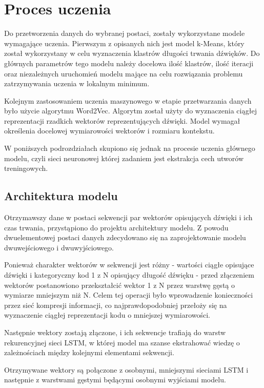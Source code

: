 \chapter{Proces uczenia} 
{
    Do przetworzenia danych do wybranej postaci, zostały wykorzystane modele wymagające uczenia.
    Pierwszym z opisanych nich jest model k-Means, który został wykorzystany w celu wyznaczenia klastrów
    długości trwania dźwięków. Do głównych parametrów tego modelu należy docelowa ilość klastrów, ilość iteracji
    oraz niezależnych uruchomień modelu mające na celu rozwiązania problemu zatrzymywania uczenia w lokalnym minimum.
    
    Kolejnym zastosowaniem uczenia maszynowego w etapie przetwarzania danych było użycie algorytmu Word2Vec. Algorytm 
    został użyty do wyznaczenia ciągłej reprezentacji rzadkich wektorów reprezentujących dźwięki. Model wymagał 
    określenia docelowej wymiarowości wektorów i rozmiaru kontekstu. 

    W poniższych podrozdziałach skupiono się jednak na procesie uczenia głównego modelu, czyli sieci neuronowej której
    zadaniem jest ekstrakcja cech utworów treningowych.

    \section{Architektura modelu}
    {
        Otrzymawszy dane w postaci sekwencji par wektorów opisujących dźwięki i ich czas trwania,
        przystąpiono do projektu architektury modelu. Z powodu dwuelementowej postaci danych
        zdecydowano się na zaprojektowanie modelu dwuwejściowego i dwuwyjściowego.

        Ponieważ charakter wektorów w sekwencji jest różny - wartości ciągłe opisujące dźwięki i 
        kategoryczny kod 1 z N opisujący długość dźwięku - przed złączeniem wektorów postanowiono 
        przekształcić wektor 1 z N przez warstwę gęstą o wymiarze mniejszym niż N. Celem tej operacji
        było wprowadzenie konieczności przez sieć kompresji informacji, co najprawdopodobniej przełoży się 
        na wyznaczenie ciągłej reprezentacji kodu o mniejszej wymiarowości. 

        Następnie wektory zostają złączone, i ich sekwencje trafiają do warstw rekurencyjnej sieci LSTM,
        w której model ma szanse ekstrahować wiedzę o zależnościach między kolejnymi elementami sekwencji.

        Otrzymywane wektory są połączone z osobnymi, mniejszymi sieciami LSTM i następnie z warstwami 
        gęstymi będącymi osobnymi wyjściami modelu.
        
}}
